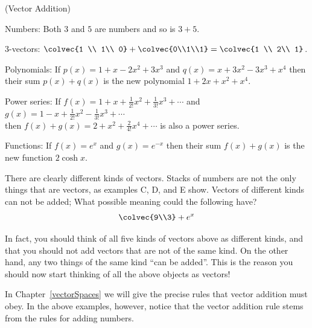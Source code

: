 \begin{example} (Vector Addition)
\begin{enumext}[label=\Alph*,wrap-label=(#1)]
\item Numbers: Both $3$ and $5$ are numbers and so is $3+5$.\\[-2mm]
\item 3-vectors: $\colvec{1 \\ 1\\ 0} + \colvec{0\\1\\1}=\colvec{1 \\ 2\\ 1}$.\\[-1mm]
\item Polynomials: If $p(x)=1+x-2x^2+3x^3$ and $q(x)=x+3x^2-3x^3+x^4$ then\\[1mm] their sum $p(x)+q(x)$ is the new polynomial $1+2x+x^2+x^4$.\\
\item Power series: If $f(x)=1+x+\frac1{2!} x^2 + \frac1{3!} x^3 +\cdots$ and $g(x)=1-x+\frac1{2!} x^2 - \frac1{3!} x^3 +\cdots$ \\[1mm]
 then $f(x)+g(x)=2+ x^2 +\frac2 {4!} x^4+\cdots$ is also a power series.\\
\item Functions: If $f(x)=e^x$ and $g(x)=e^{-x}$ then their sum $f(x)+g(x)$ is the new function $2\cosh x$.
\end{enumext}
\end{example}

\noindent
There are clearly different kinds of vectors. 
Stacks of numbers are not the only things that are vectors, as examples C, D, and E show. 
Vectors of different kinds can not be added; What possible meaning could the following have? 
$$\colvec{9\\3} + e^x$$

In fact, you should think of all five kinds of vectors above as different kinds, and that you should not add vectors that are not of the same kind. 
On the other hand, any two things of the same kind ``can be added''. 
This is the reason you should now start thinking of all the above objects as vectors! 

In Chapter~\ref{vectorSpaces} we will give the precise rules that  vector addition must obey. 
In the above examples, however, notice that the vector addition rule stems from the rules for adding numbers. 
 

